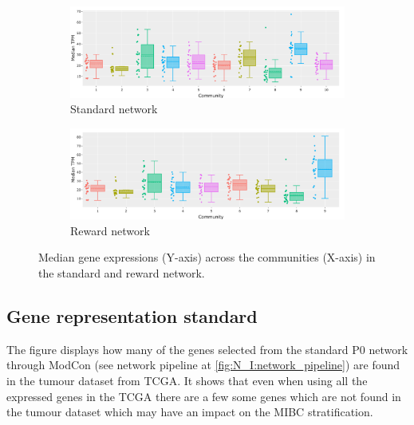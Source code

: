 \begin{figure}[H]
    \centering
    \begin{subfigure}[!t]{1.0\textwidth}
    \includegraphics[width=\textwidth,keepaspectratio]{Sections/Network_I/Resources/P0/Comms/P0_standard_4K_50TF_med.png}
        \caption{Standard network}
        \label{fig:ap:p0_chg_std_exp}
    \end{subfigure}
    \begin{subfigure}[!t]{1.0\textwidth}
        \includegraphics[width=\textwidth,keepaspectratio]{Sections/Network_I/Resources/P0/Comms/P0_norm3_4K_50TF_med.png}
            \caption{Reward network}
            \label{fig:ap:p0_chg_rwd_exp}
    \end{subfigure}
    \caption{Median gene expressions (Y-axis) across the communities (X-axis) in the standard and reward network.}
    \label{fig:ap:p0_ge_chgs}
\end{figure}

\subsection{Gene representation standard} \label{s:ap:p0_gene_rep_std}

The figure displays how many of the genes selected from the standard P0 network through ModCon (see network pipeline at \cref{fig:N_I:network_pipeline}) are found in the tumour dataset from TCGA. It shows that even when using all the expressed genes in the TCGA there are a few some genes which are not found in the tumour dataset which may have an impact on the MIBC stratification.

